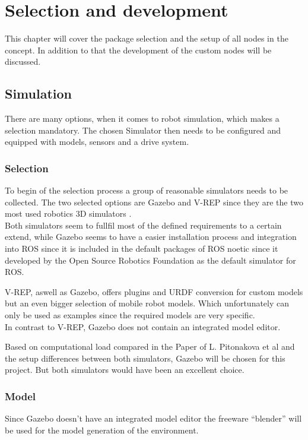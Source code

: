 \chapter{Selection and development}
\label{Selection}

This chapter will cover the package selection and the setup of all nodes in the concept. In addition to that the development of the custom nodes will be discussed.



\section{Simulation}
There are many options, when it comes to robot simulation, which makes a selection mandatory. The chosen Simulator then needs to be configured and equipped with models, sensors and a drive system.

\subsection{Selection}
To begin of the selection process a group of reasonable simulators needs to be collected. The two selected options are Gazebo and V-REP since they are the two most used robotics 3D simulators \cite{SimComp}.\\

Both simulators seem to fullfil most of the defined requirements to a certain extend, while Gazebo seems to have a easier installation process and integration into ROS since it is included in the default packages of ROS noetic since it developed by the Open Source Robotics Foundation as the default simulator for ROS\cite{ROSPkg}.

V-REP, aswell as Gazebo, offers plugins and URDF conversion for custom models but an even bigger selection of mobile robot models. Which unfortunately can only be used as examples since the required models are very specific.\\
In contrast to V-REP, Gazebo does not contain an integrated model editor.

Based on computational load compared in the Paper of L. Pitonakova et al and the setup differences between both simulators, Gazebo will be chosen for this project. But both simulators would have been an excellent choice\cite{Pitonakova}.

\subsection{Model}
Since Gazebo doesn't have an integrated model editor the freeware ``blender'' will be used for the model generation of the environment.

